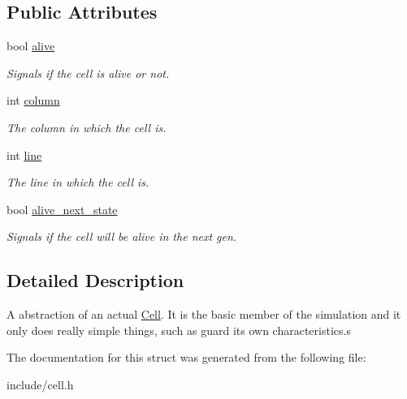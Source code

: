 \subsection*{Public Attributes}
\begin{DoxyCompactItemize}
\item 
\mbox{\label{structCell_a516ed0ccc2782e870bfe6ba56d15d86b}} 
bool \hyperlink{structCell_a516ed0ccc2782e870bfe6ba56d15d86b}{alive}
\begin{DoxyCompactList}\small\item\em Signals if the cell is alive or not. \end{DoxyCompactList}\item 
\mbox{\label{structCell_a6aae9428106f7cd7574660e3c2278ee0}} 
int \hyperlink{structCell_a6aae9428106f7cd7574660e3c2278ee0}{column}
\begin{DoxyCompactList}\small\item\em The column in which the cell is. \end{DoxyCompactList}\item 
\mbox{\label{structCell_a0e62d1c17842b662b0448b13bc248c37}} 
int \hyperlink{structCell_a0e62d1c17842b662b0448b13bc248c37}{line}
\begin{DoxyCompactList}\small\item\em The line in which the cell is. \end{DoxyCompactList}\item 
\mbox{\label{structCell_ab3a70ed1328f12a0bc808e7ec468ad50}} 
bool \hyperlink{structCell_ab3a70ed1328f12a0bc808e7ec468ad50}{alive\+\_\+next\+\_\+state}
\begin{DoxyCompactList}\small\item\em Signals if the cell will be alive in the next gen. \end{DoxyCompactList}\end{DoxyCompactItemize}


\subsection{Detailed Description}
A abstraction of an actual \hyperlink{structCell}{Cell}. It is the basic member of the simulation and it only does really simple things, such as guard its own characteristics.\+s 

The documentation for this struct was generated from the following file\+:\begin{DoxyCompactItemize}
\item 
include/cell.\+h\end{DoxyCompactItemize}
